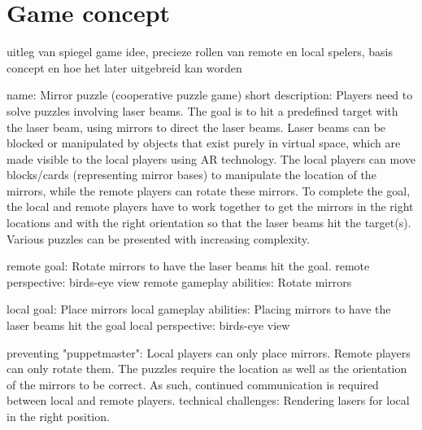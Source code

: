 \section{Game concept}

uitleg van spiegel game idee, precieze rollen van remote en local spelers, basis concept en hoe het later uitgebreid kan worden

name: Mirror puzzle (cooperative puzzle game)
short description: 
Players need to solve puzzles involving laser beams. The goal is to hit a predefined target with the laser beam, using mirrors to direct the laser beams. Laser beams can be blocked or manipulated by objects that exist purely in virtual space, which are made visible to the local players using AR technology. The local players can move blocks/cards (representing mirror bases) to manipulate the location of the mirrors, while the remote players can rotate these mirrors.
To complete the goal, the local and remote players have to work together to get the mirrors in the right locations and with the right orientation so that the laser beams hit the target(s). Various puzzles can be presented with increasing complexity.

remote goal: Rotate mirrors to have the laser beams hit the goal.
remote perspective: birds-eye view
remote gameplay abilities: Rotate mirrors

local goal: Place mirrors
local gameplay abilities: Placing mirrors to have the laser beams hit the goal
local perspective: birds-eye view

preventing "puppetmaster": Local players can only place mirrors. Remote players can only rotate them. The puzzles require the location as well as the orientation of the mirrors to be correct. As such, continued communication is required between local and remote players.
technical challenges: Rendering lasers for local in the right position. 
